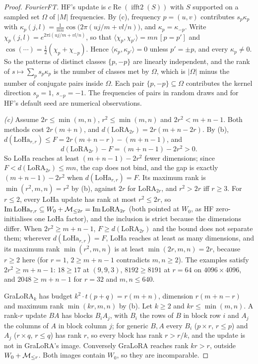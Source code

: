 \begin{proof}
\emph{FourierFT.} HF's update is $c\operatorname{Re}(\operatorname{ifft2}(S))$ with $S$ supported on a sampled set $\Omega$
of $\lvert M\rvert$ frequencies. By (c), frequency $p=(u,v)$ contributes $s_p\kappa_p$ with
$\kappa_p(j,l)=\tfrac1{mn}\cos\big(2\pi(uj/m+vl/n)\big)$, and $\kappa_p=\kappa_{-p}$. Write $\chi_p(j,l)=e^{2\pi\mathrm
i(uj/m+vl/n)}$, so that $\langle\chi_p,\chi_{p'}\rangle=mn\,[p=p']$ and $\cos(\cdots)=\tfrac12(\chi_p+\chi_{-p})$. Hence
$\langle\kappa_p,\kappa_{p'}\rangle=0$ unless $p'=\pm p$, and every $\kappa_p\ne0$. So the patterns of distinct classes
$\{p,-p\}$ are linearly independent, and the rank of $s\mapsto\sum_ps_p\kappa_p$ is the number of classes met by $\Omega$, which
is $\lvert\Omega\rvert$ minus the number of conjugate pairs inside $\Omega$. Each pair $\{p,-p\}\subseteq\Omega$ contributes
the kernel direction $s_p=1$, $s_{-p}=-1$. The frequencies of pairs in random draws and for HF's default seed are numerical
observations.

\emph{(c)} Assume $2r\le\min(m,n)$, $r^2\le\min(m,n)$ and $2r^2<m+n-1$. Both methods cost $2r(m+n)$, and
$d(\mathrm{LoRA}_{2r})=2r(m+n-2r)$. By (b), $d(\mathrm{LoHa}_{r,r})\le F=2r(m+n-r)-(m+n-1)$, and
\begin{equation*}
  d(\mathrm{LoRA}_{2r})-F=(m+n-1)-2r^2>0 .
\end{equation*}
So LoHa reaches at least $(m+n-1)-2r^2$ fewer dimensions; since $F<d(\mathrm{LoRA}_{2r})\le mn$, the cap does not bind, and
the gap is exactly $(m+n-1)-2r^2$ when $d(\mathrm{LoHa}_{r,r})=F$. Its maximum rank is $\min(r^2,m,n)=r^2$ by (b), against
$2r$ for $\mathrm{LoRA}_{2r}$, and $r^2>2r$ iff $r\ge3$. For $r\le2$, every LoHa update has rank at most $r^2\le2r$, so
$\operatorname{Im}\mathrm{LoHa}_{r,r}\subseteq W_0+\mathcal{M}_{\le2r}=\operatorname{Im}\mathrm{LoRA}_{2r}$ (both pointed at $W_0$, as HF zero-initialises one
LoHa factor), and the inclusion is strict because the dimensions differ. When $2r^2\ge m+n-1$, $F\ge d(\mathrm{LoRA}_{2r})$ and
the bound does not separate them; wherever $d(\mathrm{LoHa}_{r,r})=F$, LoHa reaches at least as many dimensions, and its
maximum rank $\min(r^2,m,n)$ is at least $\min(2r,m,n)=2r$, because $r\ge2$ here (for $r=1$, $2\ge m+n-1$ contradicts
$m,n\ge2$). The examples satisfy $2r^2\ge m+n-1$: $18\ge17$ at $(9,9,3)$, $8192\ge8191$ at $r=64$ on $4096\times4096$, and
$2048\ge m+n-1$ for $r=32$ and $m,n\le640$.

GraLoRA$_k$ has budget $k^2\cdot t(p+q)=r(m+n)$, dimension $r(m+n-r)$ and maximum rank $\min(kr,m,n)$ by (b). Let $k\ge2$ and
$kr\le\min(m,n)$. A rank-$r$ update $BA$ has blocks $B_iA_j$, with $B_i$ the rows of $B$ in block row $i$ and $A_j$ the
columns of $A$ in block column $j$; for generic $B,A$ every $B_i$ ($p\times r$, $r\le p$) and $A_j$ ($r\times q$, $r\le q$) has
rank $r$, so every block has rank $r>r/k$, and the update is not in GraLoRA's image. Conversely GraLoRA reaches rank $kr>r$,
outside $W_0+\mathcal{M}_{\le r}$. Both images contain $W_0$, so they are incomparable.
\end{proof}

